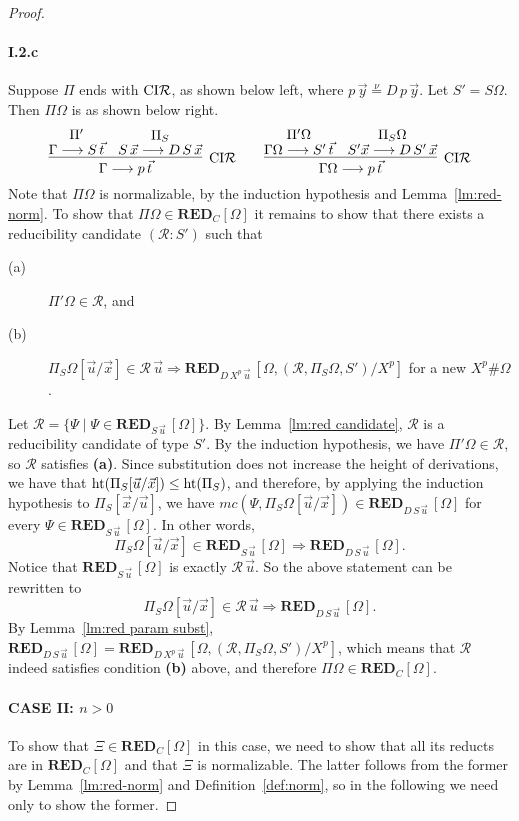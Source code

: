 \documentclass[preprint]{elsarticle}
\def\Rscr{{\mathcal R}}
\newcommand{\Seq}[2]{#1\longrightarrow #2}
\newcommand{\defnu}{\stackrel{\nu}{=}}
\newcommand{\coindR}{{\rm CI}{\cal R}}
\newcommand{\measure}[1]{{\rm ht}(#1)}
\def\RED{{\mathbf{RED}}}
\begin{document}
\begin{proof}
\paragraph{\bf I.2.c} Suppose $\Pi$ ends with $\coindR$,
as shown below left, where $p\,\vec y \defnu D\,p\,\vec y$. Let $S' = S\Omega$.  Then
$\Pi\Omega$ is as shown below right.
$$
\infer[\coindR] {\Seq \Gamma {p\,\vec t}} { \deduce{\Seq \Gamma
    {S\,\vec t}}{\Pi'} & \deduce{\Seq {S\,\vec x}{D\,S\,\vec
      x}}{\Pi_S} }
\qquad
\infer[\coindR] {\Seq {\Gamma\Omega} {p\,\vec t}} { \deduce{\Seq
    {\Gamma\Omega}{S'\,\vec t}}{\Pi'\Omega} & \deduce{\Seq {S'\vec
      x}{D\,S'\,\vec x}}{\Pi_S\Omega} }
$$
Note that $\Pi\Omega$ is normalizable, by the induction hypothesis and
Lemma~\ref{lm:red-norm}.  To show that $\Pi\Omega \in \RED_C[\Omega]$
it remains to show that there exists a reducibility candidate $(\Rscr
: S')$ such that
\begin{description}
\item[(a)] $\Pi'\Omega \in \Rscr$, and
\item[(b)] $\Pi_S\Omega[\vec u/\vec x] \in \Rscr\,\vec u \Rightarrow
  \RED_{D\,X^p\,\vec u}\, [\Omega, (\Rscr, \Pi_S\Omega, S')/X^p]$ for a
  new $X^p \# \Omega$.
\end{description}
Let
$
\Rscr = \{\Psi \mid \Psi \in \RED_{S\,\vec u}\, [\Omega] \}.
$
By Lemma~\ref{lm:red candidate}, $\Rscr$ is a reducibility candidate
of type $S'$.  By the induction hypothesis, we have $\Pi'\Omega \in
\Rscr$, so $\Rscr$ satisfies {\bf (a)}.  Since substitution does not
increase the height of derivations, we have that $\measure{\Pi_S[\vec
  u/ \vec x]} \leq \measure{\Pi_S}$, and therefore, by applying the
induction hypothesis to $\Pi_S[\vec x/\vec u]$, we have
$
mc(\Psi, \Pi_S\Omega[\vec u/\vec x]) \in \RED_{D\,S\,\vec u}\, [\Omega]
$
for every $\Psi \in \RED_{S\,\vec u}\, [\Omega]$. In other words,
$$
\Pi_S\Omega[\vec u/\vec x] \in \RED_{S\,\vec u}\, [\Omega] \Rightarrow
\RED_{D\,S\,\vec u}\, [\Omega].
$$
Notice that $\RED_{S\,\vec u}\, [\Omega]$ is exactly $\Rscr\,\vec u$.  So
the above statement can be rewritten to
$$
\Pi_S\Omega[\vec u/\vec x] \in \Rscr\,\vec u \Rightarrow
\RED_{D\,S\,\vec u}\, [\Omega].
$$
By Lemma~\ref{lm:red param subst}, $\RED_{D\,S\,\vec u}\, [\Omega] =
\RED_{D\,X^p\,\vec u}\, [\Omega, (\Rscr, \Pi_S\Omega, S')/X^p]$, which
means that $\Rscr$ indeed satisfies condition {\bf (b)} above, and
therefore $\Pi\Omega \in \RED_C[\Omega]$.



\paragraph{\bf CASE II: $n > 0$} 
To show that $\Xi \in \RED_C[\Omega]$ in this case, we need to show
that all its reducts are in $\RED_C[\Omega]$ and that $\Xi$ is
normalizable.  The latter follows from the former by
Lemma~\ref{lm:red-norm} and Definition~\ref{def:norm}, so in the
following we need only to show the former.


\end{proof}
\end{document}
